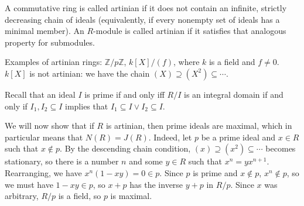 A commutative ring is called artinian if it does not contain an infinite,
strictly decreasing chain of ideals (equivalently, if every nonempty set of
ideals has a minimal member). An $R$-module is called artinian if it satisfies
that analogous property for submodules.

Examples of artinian rings: $\mathbb{Z}/p\mathbb{Z}$, $k[X]/(f)$, where $k$ is
a field and $f\neq 0$. $k[X]$ is not artinian: we have the chain
$(X) \supseteq (X^2) \subseteq \cdots$.

Recall that an ideal $I$ is prime if and only iff $R/I$ is an integral domain
if and only if $I_1, I_2 \subseteq I$ implies that $I_1 \subseteq I\vee I_2 \subseteq I$.

We will now show that if $R$ is artinian, then prime ideals are maximal, which
in particular means that $N(R) = J(R)$. Indeed, let $p$ be a prime ideal and $x \in R$
such that $x \notin p$. By the descending chain condition, $(x) \supseteq (x^2) \subseteq \cdots$
becomes stationary, so there is a number $n$ and some $y \in R$ such that
$x^n = yx^{n+1}$. Rearranging, we have $x^n(1-xy) = 0 \in p$. Since $p$ is prime
and $x\notin p$, $x^n\notin p$, so we must have $1-xy\in p$, so $x + p$ has the
inverse $y+p$ in $R/p$. Since $x$ was arbitrary, $R/p$ is a field, so $p$ is
maximal.
